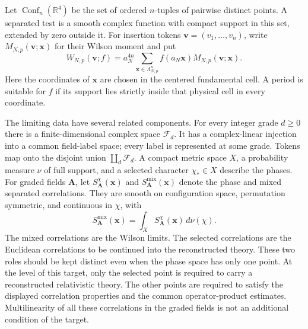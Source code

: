 Let \(\operatorname{Conf}_n(\mathbb R^4)\) be the set of ordered
\(n\)-tuples of pairwise distinct points. A separated test is a smooth
complex function with compact support in this set, extended by zero outside
it. For insertion tokens \(\boldsymbol v=(v_1,\ldots,v_n)\), write
\(M_{N,p}(\boldsymbol v;\boldsymbol x)\) for their Wilson moment and put
\begin{equation}\label{ex-smearing}
 W_{N,p}(\boldsymbol v;f)=a_N^{4n}
 \sum_{\boldsymbol x\in\Lambda_{N,p}^n}
 f(a_N\boldsymbol x)M_{N,p}(\boldsymbol v;\boldsymbol x).
\end{equation}
Here the coordinates of \(\boldsymbol x\) are chosen in the centered
fundamental cell. A period is suitable for \(f\) if its support lies strictly
inside that physical cell in every coordinate.

The limiting data have several related components. For every integer grade
\(d\ge0\) there is a finite-dimensional complex space \(\mathcal F_d\).
It has a complex-linear injection into a common field-label space; every label is
represented at some grade. Tokens map onto the disjoint union
\(\coprod_d\mathcal F_d\). A compact metric space \(X\), a probability
measure \(\nu\) of full support, and a selected character \(\chi_*\in X\)
describe the phases. For graded fields \(\boldsymbol A\), let
\(S^{\chi}_{\boldsymbol A}(\boldsymbol x)\) and
\(S^{\mathrm{mix}}_{\boldsymbol A}(\boldsymbol x)\) denote the phase and
mixed separated correlations. They are smooth on configuration space,
permutation symmetric, and continuous in \(\chi\), with
\begin{equation}\label{ex-mixture}
 S^{\mathrm{mix}}_{\boldsymbol A}(\boldsymbol x)
   =\int_X S^{\chi}_{\boldsymbol A}(\boldsymbol x)\,d\nu(\chi).
\end{equation}
The mixed correlations are the Wilson limits. The selected correlations
are the Euclidean correlations to be continued into the reconstructed theory.
These two roles should be kept distinct even when the phase space has only
one point. At the level of this target, only the selected point is required
to carry a reconstructed relativistic theory. The other points are required
to satisfy the displayed correlation properties and the common
operator-product estimates. Multilinearity of all these correlations in the
graded fields is not an additional condition of the target.

